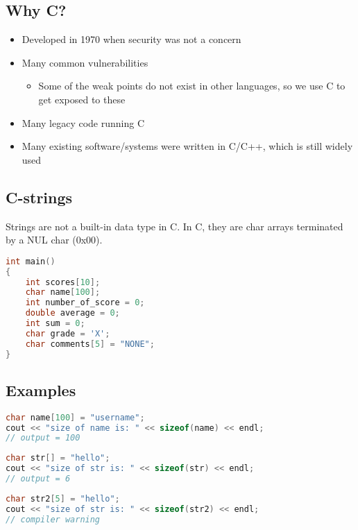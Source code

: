 \documentclass[11pt,a4paper]{article}
\begin{document}
\subsection{Why C?}
\begin{itemize}
    \item Developed in 1970 when security was not a concern
    \item Many common vulnerabilities
    \begin{itemize}
        \item Some of the weak points do not exist in other languages, so we use C to get exposed to these
    \end{itemize}
    \item Many legacy code running C
    \item Many existing software/systems were written in C/C++, which is still widely used
\end{itemize}

\subsection{C-strings}

Strings are not a built-in data type in C. In C, they are char arrays terminated by a NUL char (0x00).

\begin{lstlisting}[language=C, caption=Example C String Usage]
int main()
{
    int scores[10];
    char name[100];
    int number_of_score = 0;
    double average = 0;
    int sum = 0;
    char grade = 'X';
    char comments[5] = "NONE";
}
\end{lstlisting}

\subsection{Examples}

\begin{lstlisting}[language=C, caption=Example 1]
char name[100] = "username";
cout << "size of name is: " << sizeof(name) << endl;
// output = 100
\end{lstlisting}

\begin{lstlisting}[language=C, caption=Example 2]
char str[] = "hello";
cout << "size of str is: " << sizeof(str) << endl;
// output = 6
\end{lstlisting}

\begin{lstlisting}[language=C, caption=Example 3]
char str2[5] = "hello";
cout << "size of str is: " << sizeof(str2) << endl;
// compiler warning
\end{lstlisting}
\end{document}
